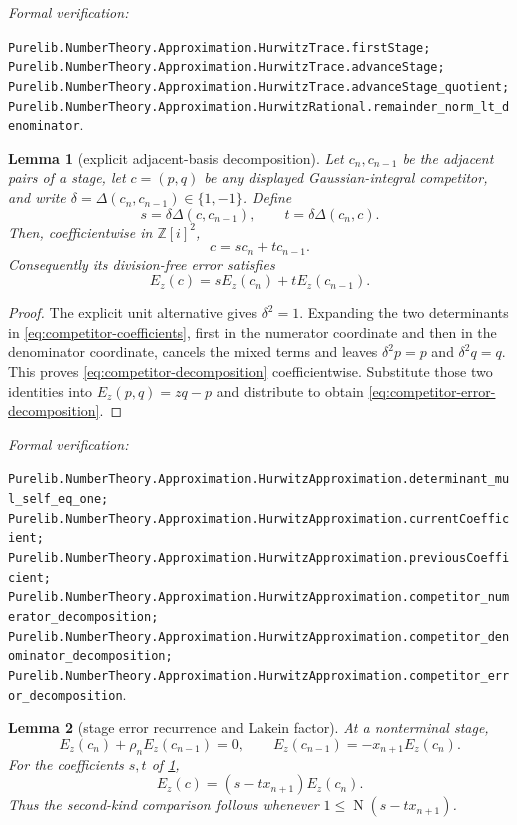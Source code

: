 \documentclass[11pt]{article}
\newtheorem{lemma}[lemma]{Lemma}
\newcommand{\Zi}{\mathbb{Z}[i]}
\newcommand{\Norm}[1]{\operatorname{N}\!\left(#1\right)}
\newcommand{\leanref}[1]{\par\smallskip\noindent
  \emph{Formal verification:}\par\nobreak
  {\raggedright\nolinkurl{#1}.\par}}
\begin{document}
\leanref{Purelib.NumberTheory.Approximation.HurwitzTrace.firstStage;
Purelib.NumberTheory.Approximation.HurwitzTrace.advanceStage;
Purelib.NumberTheory.Approximation.HurwitzTrace.advanceStage_quotient;
Purelib.NumberTheory.Approximation.HurwitzRational.remainder_norm_lt_denominator}

\begin{lemma}[explicit adjacent-basis decomposition]
\label{lem:adjacent-basis-decomposition}
Let $c_n,c_{n-1}$ be the adjacent pairs of a stage, let $c=(p,q)$ be any
displayed Gaussian-integral competitor, and write
$\delta=\Delta(c_n,c_{n-1})\in\{1,-1\}$.  Define
\begin{equation}
\label{eq:competitor-coefficients}
 s=\delta\Delta(c,c_{n-1}),
 \qquad t=\delta\Delta(c_n,c).
\end{equation}
Then, coefficientwise in $\Zi^2$,
\begin{equation}
\label{eq:competitor-decomposition}
                         c=sc_n+tc_{n-1}.
\end{equation}
Consequently its division-free error satisfies
\begin{equation}
\label{eq:competitor-error-decomposition}
            E_z(c)=sE_z(c_n)+tE_z(c_{n-1}).
\end{equation}
\end{lemma}

\begin{proof}
The explicit unit alternative gives $\delta^2=1$.  Expanding the two
determinants in \eqref{eq:competitor-coefficients}, first in the numerator
coordinate and then in the denominator coordinate, cancels the mixed terms
and leaves $\delta^2p=p$ and $\delta^2q=q$.  This proves
\eqref{eq:competitor-decomposition} coefficientwise.  Substitute those two
identities into $E_z(p,q)=zq-p$ and distribute to obtain
\eqref{eq:competitor-error-decomposition}.
\end{proof}

\leanref{Purelib.NumberTheory.Approximation.HurwitzApproximation.determinant_mul_self_eq_one;
Purelib.NumberTheory.Approximation.HurwitzApproximation.currentCoefficient;
Purelib.NumberTheory.Approximation.HurwitzApproximation.previousCoefficient;
Purelib.NumberTheory.Approximation.HurwitzApproximation.competitor_numerator_decomposition;
Purelib.NumberTheory.Approximation.HurwitzApproximation.competitor_denominator_decomposition;
Purelib.NumberTheory.Approximation.HurwitzApproximation.competitor_error_decomposition}

\begin{lemma}[stage error recurrence and Lakein factor]
\label{lem:lakein-factor}
At a nonterminal stage,
\begin{equation}
\label{eq:stage-error-recurrence}
 E_z(c_n)+\rho_nE_z(c_{n-1})=0,
 \qquad
 E_z(c_{n-1})=-x_{n+1}E_z(c_n).
\end{equation}
For the coefficients $s,t$ of
\cref{lem:adjacent-basis-decomposition},
\begin{equation}
\label{eq:lakein-factor}
                         E_z(c)=(s-tx_{n+1})E_z(c_n).
\end{equation}
Thus the second-kind comparison follows whenever
$1\le\Norm{s-tx_{n+1}}$.
\end{lemma}
\end{document}
